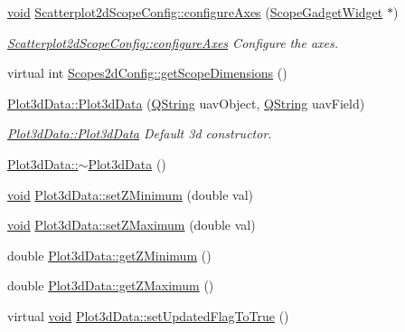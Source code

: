 \begin{DoxyCompactItemize}
\hyperlink{group___u_a_v_objects_plugin_ga444cf2ff3f0ecbe028adce838d373f5c}{void} \hyperlink{group___scope_plugin_ga420168b2c6740e98666d76cf58bfb2ee}{\-Scatterplot2d\-Scope\-Config\-::configure\-Axes} (\hyperlink{class_scope_gadget_widget}{\-Scope\-Gadget\-Widget} $\ast$)
\begin{DoxyCompactList}\small\item\em \hyperlink{group___scope_plugin_ga420168b2c6740e98666d76cf58bfb2ee}{\-Scatterplot2d\-Scope\-Config\-::configure\-Axes} \-Configure the axes. \end{DoxyCompactList}\item 
virtual int \hyperlink{group___scope_plugin_ga95a6bd24b6f73fad855102d785678676}{\-Scopes2d\-Config\-::get\-Scope\-Dimensions} ()
\item 
\hyperlink{group___scope_plugin_ga1f2325d51b8163d0c535e07fda3ff043}{\-Plot3d\-Data\-::\-Plot3d\-Data} (\hyperlink{group___u_a_v_objects_plugin_gab9d252f49c333c94a72f97ce3105a32d}{\-Q\-String} uav\-Object, \hyperlink{group___u_a_v_objects_plugin_gab9d252f49c333c94a72f97ce3105a32d}{\-Q\-String} uav\-Field)
\begin{DoxyCompactList}\small\item\em \hyperlink{group___scope_plugin_ga1f2325d51b8163d0c535e07fda3ff043}{\-Plot3d\-Data\-::\-Plot3d\-Data} \-Default 3d constructor. \end{DoxyCompactList}\item 
\hyperlink{group___scope_plugin_gaba0a6fcc762d6818f231df0e8a975089}{\-Plot3d\-Data\-::$\sim$\-Plot3d\-Data} ()
\item 
\hyperlink{group___u_a_v_objects_plugin_ga444cf2ff3f0ecbe028adce838d373f5c}{void} \hyperlink{group___scope_plugin_gaa8457325b9ed2d7199e882002d9cb64f}{\-Plot3d\-Data\-::set\-Z\-Minimum} (double val)
\item 
\hyperlink{group___u_a_v_objects_plugin_ga444cf2ff3f0ecbe028adce838d373f5c}{void} \hyperlink{group___scope_plugin_gad2d6739b5faacba8f73c88fbc9b6592d}{\-Plot3d\-Data\-::set\-Z\-Maximum} (double val)
\item 
double \hyperlink{group___scope_plugin_ga1b7cd5b46f3d8a13bcdba217cc7fe392}{\-Plot3d\-Data\-::get\-Z\-Minimum} ()
\item 
double \hyperlink{group___scope_plugin_ga9d0722b373e8cf2ea23d29cc8717f8ef}{\-Plot3d\-Data\-::get\-Z\-Maximum} ()
\item 
virtual \hyperlink{group___u_a_v_objects_plugin_ga444cf2ff3f0ecbe028adce838d373f5c}{void} \hyperlink{group___scope_plugin_ga08cc07e86d20dc6dad41488e34bb196c}{\-Plot3d\-Data\-::set\-Updated\-Flag\-To\-True} ()

\end{DoxyCompactItemize}
